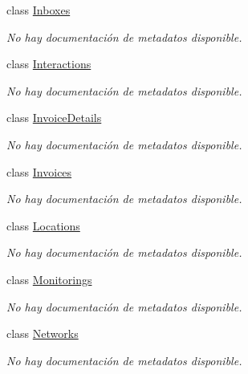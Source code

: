 \begin{DoxyCompactItemize}
class \hyperlink{class_microsoft_1_1_samples_1_1_kinect_1_1_basic_interactions_1_1_inboxes}{Inboxes}
\begin{DoxyCompactList}\small\item\em No hay documentación de metadatos disponible. \end{DoxyCompactList}\item 
class \hyperlink{class_microsoft_1_1_samples_1_1_kinect_1_1_basic_interactions_1_1_interactions}{Interactions}
\begin{DoxyCompactList}\small\item\em No hay documentación de metadatos disponible. \end{DoxyCompactList}\item 
class \hyperlink{class_microsoft_1_1_samples_1_1_kinect_1_1_basic_interactions_1_1_invoice_details}{Invoice\-Details}
\begin{DoxyCompactList}\small\item\em No hay documentación de metadatos disponible. \end{DoxyCompactList}\item 
class \hyperlink{class_microsoft_1_1_samples_1_1_kinect_1_1_basic_interactions_1_1_invoices}{Invoices}
\begin{DoxyCompactList}\small\item\em No hay documentación de metadatos disponible. \end{DoxyCompactList}\item 
class \hyperlink{class_microsoft_1_1_samples_1_1_kinect_1_1_basic_interactions_1_1_locations}{Locations}
\begin{DoxyCompactList}\small\item\em No hay documentación de metadatos disponible. \end{DoxyCompactList}\item 
class \hyperlink{class_microsoft_1_1_samples_1_1_kinect_1_1_basic_interactions_1_1_monitorings}{Monitorings}
\begin{DoxyCompactList}\small\item\em No hay documentación de metadatos disponible. \end{DoxyCompactList}\item 
class \hyperlink{class_microsoft_1_1_samples_1_1_kinect_1_1_basic_interactions_1_1_networks}{Networks}
\begin{DoxyCompactList}\small\item\em No hay documentación de metadatos disponible. \end{DoxyCompactList}\item 

\end{DoxyCompactItemize}
